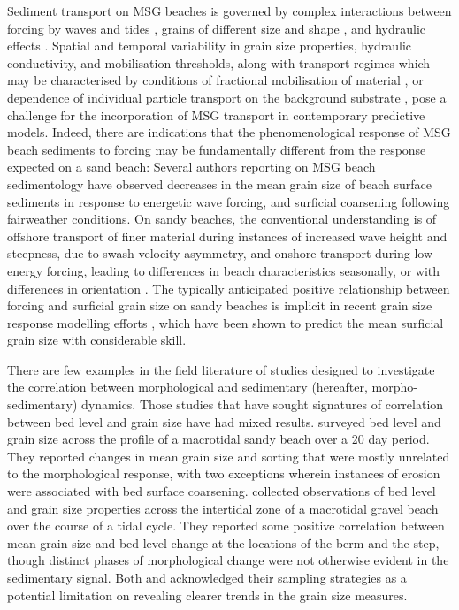 \documentclass[preprint,12pt,authoryear]{elsarticle}
\begin{document}
Sediment transport on MSG beaches is governed by complex interactions between forcing by waves and tides \citep{Nordstrom_Jackson1993}, grains of different size and shape \citep{Stark_etal2014, Stark_Hay2016}, and hydraulic effects \citep[in/exfiltration and groundwater response;][]{Horn2006}. Spatial and temporal variability in grain size properties, hydraulic conductivity, and mobilisation thresholds, along with transport regimes which may be characterised by conditions of fractional mobilisation of material \citep[e.g.,][]{Wilcock_Crowe2003}, or dependence of individual particle transport on the background substrate \citep{Carter_Orford1993}, pose a challenge for the incorporation of MSG transport in contemporary predictive models. Indeed, there are indications that the phenomenological response of MSG beach sediments to forcing may be fundamentally different from the response expected on a sand beach: Several authors reporting on MSG beach sedimentology \citep{Nordstrom_Jackson1993, Pontee_etal2004, Curtiss_etal2009, Miller_etal2011, Hay_etal2014} have observed decreases in the mean grain size of beach surface sediments in response to energetic wave forcing, and surficial coarsening following fairweather conditions. On sandy beaches, the conventional understanding is of offshore transport of finer material during instances of increased wave height and steepness, due to swash velocity asymmetry, and onshore transport during low energy forcing, leading to differences in beach characteristics seasonally, or with differences in orientation \citep[e.g.,][]{Bascom1951}. The typically anticipated positive relationship between forcing and surficial grain size on sandy beaches is implicit in recent grain size response modelling efforts \citep[see][]{Prodger_etal2016}, which have been shown to predict the mean surficial grain size with considerable skill.

There are few examples in the field literature of studies designed to investigate the correlation between morphological and sedimentary (hereafter, morpho-sedimentary) dynamics. Those studies that have sought signatures of correlation between bed level and grain size have had mixed results. \citet{Masselink_etal2007} surveyed bed level and grain size across the profile of a macrotidal sandy beach over a 20 day period. They reported changes in mean grain size and sorting that were mostly unrelated to the morphological response, with two exceptions wherein instances of erosion were associated with bed surface coarsening. \citet{Austin_Buscombe2008} collected observations of bed level and grain size properties across the intertidal zone of a macrotidal gravel beach over the course of a tidal cycle. They reported some positive correlation between mean grain size and bed level change at the locations of the berm and the step, though distinct phases of morphological change were not otherwise evident in the sedimentary signal. Both \citet{Masselink_etal2007} and \citet{Austin_Buscombe2008} acknowledged their sampling strategies as a potential limitation on revealing clearer trends in the grain size measures.
\end{document}

